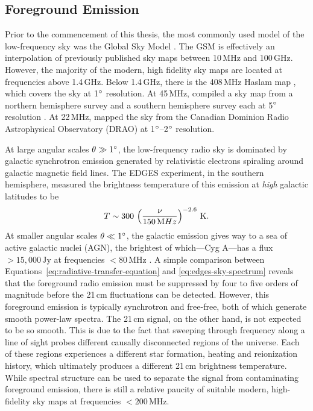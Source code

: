\begin{bibunit}
\subsection{Foreground Emission}

Prior to the commencement of this thesis, the most commonly used model of the low-frequency sky was
the Global Sky Model \citep[GSM;][]{2008MNRAS.388..247D}. The GSM is effectively an interpolation of
previously published sky maps between 10\,MHz and 100\,GHz. However, the majority of the modern,
high fidelity sky maps are located at frequencies above 1.4\,GHz. Below 1.4\,GHz, there is the
408\,MHz Haslam map \citep{1981A&A...100..209H,1982A&AS...47....1H}, which covers the sky at
1$\arcdeg$ resolution. At 45\,MHz, \citet{2011A&A...525A.138G} compiled a sky map from a northern
hemisphere survey and a southern hemisphere survey each at 5$\arcdeg$ resolution
\citep{1997A&AS..124..315A, 1999A&AS..140..145M}. At 22\,MHz, \citet{1999A&AS..137....7R} mapped the
sky from the Canadian Dominion Radio Astrophysical Observatory (DRAO) at 1$\arcdeg$--2$\arcdeg$
resolution.

At large angular scales $\theta \gg 1\arcdeg$, the low-frequency radio sky is dominated by galactic
synchrotron emission generated by relativistic electrons spiraling around galactic magnetic field
lines. The EDGES experiment, in the southern hemisphere, measured the brightness temperature of this
emission at \emph{high} galactic latitudes to be \citep{2017MNRAS.464.4995M}
\begin{equation}\label{eq:edges-sky-spectrum}
    T \sim 300\,\left(\frac{\nu}{150\,{\rm MHz}}\right)^{-2.6}\,\text{K}.
\end{equation}
At smaller angular scales $\theta \ll 1\arcdeg$, the galactic emission gives way to a sea of active
galactic nuclei (AGN), the brightest of which---Cyg A---has a flux $>15,000\,\text{Jy}$ at frequencies
$<80\,\text{MHz}$ \citep{1977A&A....61...99B}. A simple comparison between
Equations~\ref{eq:radiative-transfer-equation} and \ref{eq:edges-sky-spectrum} reveals that the
foreground radio emission must be suppressed by four to five orders of magnitude before the 21\,cm
fluctuations can be detected.  However, this foreground emission is typically synchrotron and
free-free, both of which generate smooth power-law spectra. The 21\,cm signal, on the other hand, is
not expected to be so smooth. This is due to the fact that sweeping through frequency along a line
of sight probes different causally disconnected regions of the universe. Each of these regions
experiences a different star formation, heating and reionization history, which ultimately produces
a different 21\,cm brightness temperature.  While spectral structure can be used to separate the
signal from contaminating foreground emission, there is still a relative paucity of suitable modern,
high-fidelity sky maps at frequencies $<200\,\text{MHz}$.


\end{bibunit}
